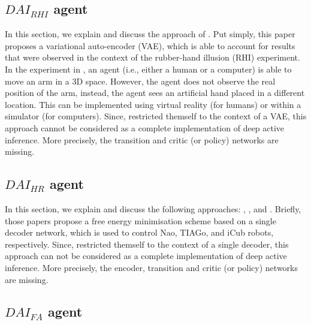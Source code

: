 \documentclass[twoside,11pt]{article}
\begin{document}
\subsection{$DAI_{RHI}$ agent \citep{rood2020deep}}

In this section, we explain and discuss the approach of \citet{rood2020deep}. Put simply, this paper proposes a variational auto-encoder (VAE), which is able to account for results that were observed in the context of the rubber-hand illusion (RHI) experiment. In the experiment in \citet{rood2020deep}, an agent (i.e., either a human or a computer) is able to move an arm in a 3D space. However, the agent does not observe the real position of the arm, instead, the agent sees an artificial hand placed in a different location. This can be implemented using virtual reality (for humans) or within a simulator (for computers). Since, \citet{rood2020deep} restricted themself to the context of a VAE, this approach cannot be considered as a complete implementation of deep active inference. More precisely, the transition and critic (or policy) networks are missing.

\subsection{$DAI_{HR}$ agent \citep{sancaktar2020endtoend,DAI_HR,DAI_HR2}}

In this section, we explain and discuss the following approaches: \citet{sancaktar2020endtoend}, \citet{DAI_HR}, and \citet{DAI_HR2}. Briefly, those papers propose a free energy minimisation scheme based on a single decoder network, which is used to control Nao, TIAGo, and iCub robots, respectively. Since, \citet{sancaktar2020endtoend,DAI_HR,DAI_HR2} restricted themself to the context of a single decoder, this approach can not be considered as a complete implementation of deep active inference. More precisely, the encoder, transition and critic (or policy) networks are missing.

\subsection{$DAI_{FA}$ agent \citep{DAI_Kai}} \label{ssec:dai_approach}
\end{document}
